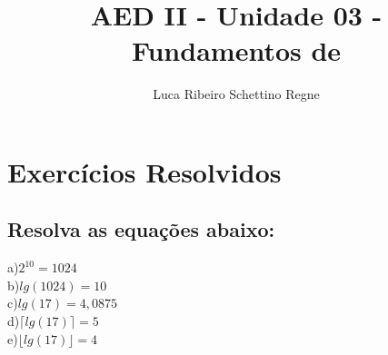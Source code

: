 \documentclass[12pt]{article}
\title{AED II - Unidade 03 - Fundamentos de }
\author{Luca Ribeiro Schettino Regne}
\begin{document}
 

\maketitle

\section{Exercícios Resolvidos}
\subsection{Resolva as equações abaixo:}
a)$ 2^{10} = 1024$\\
b)$ lg(1024) = 10$\\
c)$ lg(17) = 	4,0875 $\\
d)$ \lceil{lg(17)}\rceil = 5$\\
e)$ \lfloor{lg(17)}\rfloor  = 4$
\end{document}
